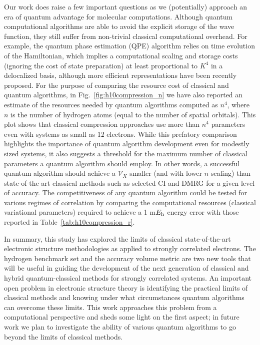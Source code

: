 \documentclass[aip,jcp,amsmath,amssymb, reprint]{revtex4-1}
\newcommand*{\Eh}{$E_{\rm h}$\xspace}
\newcommand*{\ncomp}{\mathcal{V}_X}
\begin{document}
Our work does raise a few important questions as we (potentially) approach an era of quantum advantage for molecular computations.
Although quantum computational algorithms are able to avoid the explicit storage of the wave function, they still suffer from non-trivial classical computational overhead.
For example, the quantum phase estimation\cite{Abrams:1997ha,Abrams:1999ur}  (QPE) algorithm relies on time evolution of the Hamiltonian, which implies a computational scaling and storage costs (ignoring the cost of state preparation) at least proportional to $K^4$ in a delocalized basis, although more efficient representations have been recently proposed.\cite{babbush2018low,mcclean2019discontinuous}
For the purpose of comparing the resource cost of classical and quantum algorithms, in Fig.~\ref{fig:h10compression_n} we have also reported an estimate of the resources needed by quantum algorithms computed as $n^4$, where $n$ is the number of hydrogen atoms (equal to the number of spatial orbitals).
This plot shows that classical compression approaches use more than $n^4$ parameters even with systems as small as 12 electrons.
While this prefatory comparison highlights the importance of quantum algorithm development even for modestly sized systems, it also suggests a threshold for the maximum number of classical parameters a quantum algorithm should employ.
In other words, a successful quantum algorithm should achieve a $\ncomp$ smaller (and with lower $n$-scaling) than state-of-the art classical methods such as selected CI and DMRG for a given level of accuracy.
The competitiveness of any quantum algorithm could be tested for various regimes of correlation by comparing the computational resources (classical variational parameters) required to achieve a 1 m\Eh energy error with those reported in Table~\ref{tab:h10compression_r}.

In summary, this study has explored the limits of classical state-of-the-art electronic structure methodologies as applied to strongly correlated electrons.
The hydrogen benchmark set and the accuracy volume metric are two new tools that will be useful in guiding the development of the next generation of classical and hybrid quantum-classical methods for strongly correlated systems.
An important open problem in electronic structure theory is identifying the practical limits of classical methods and knowing under what circumstances quantum algorithms can overcome these limits.
This work approaches this problem from a computational perspective and sheds some light on the first aspect; in future work we plan to investigate the ability of various quantum algorithms to go beyond the limits of classical methods.
\end{document}
